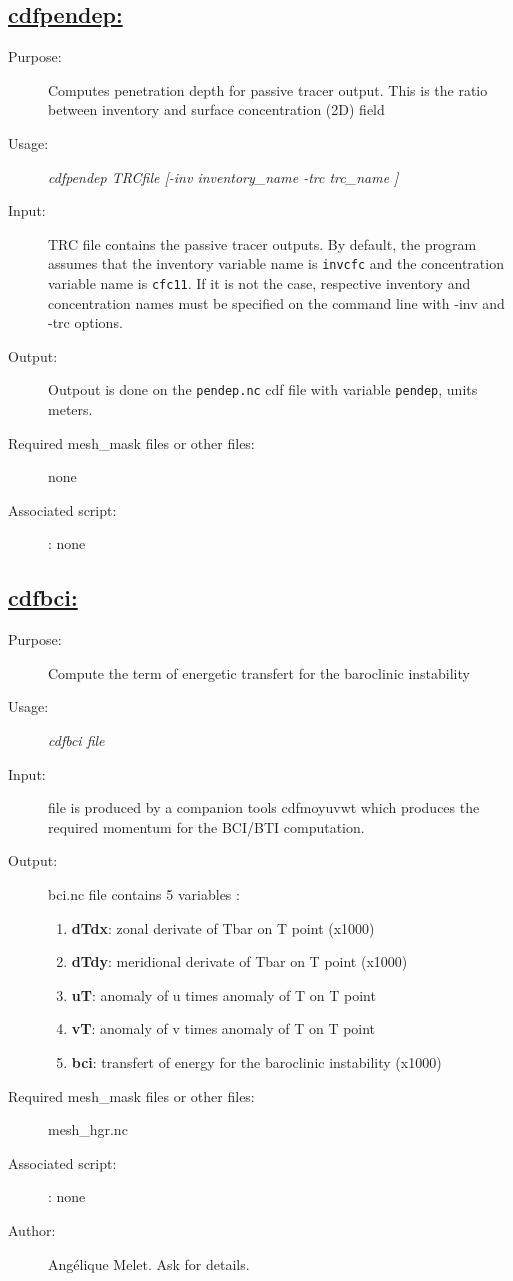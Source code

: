 \documentclass[a4paper,11pt]{article}
\begin{document}
\subsection*{\underline{cdfpendep:}}
\begin{description}
\item[Purpose:] Computes penetration depth for passive tracer output. This is the ratio between inventory
         and surface concentration (2D) field
\item[Usage:] {\em cdfpendep TRCfile [-inv inventory\_name  -trc trc\_name ] }
\item[Input:] TRC file contains the passive tracer outputs. By default, the program assumes that the inventory variable name is
{\tt invcfc} and the concentration variable name is {\tt cfc11}. If it is not the case, respective inventory and concentration names must
be specified on the command line with -inv and -trc options.
\item[Output:] Outpout is done on the {\tt pendep.nc} cdf file with variable {\tt pendep}, units meters.
\item[Required mesh\_mask files or other files:] none
\item[Associated script:] : none
\end{description}

\newpage
\subsection*{\underline{cdfbci:}}
\begin{description}
\item[Purpose:] Compute the term of energetic transfert for the baroclinic instability 
\item[Usage:] {\em cdfbci  file }
\item[Input:] file is produced by a companion tools cdfmoyuvwt which produces the required momentum for the BCI/BTI computation.
\item[Output:] bci.nc file contains 5 variables : 
     \begin{enumerate} 
        \item {\bf dTdx}:  zonal derivate of Tbar on T point (x1000)
        \item {\bf dTdy}:  meridional derivate of Tbar on T point (x1000)
        \item {\bf uT}: anomaly of u times anomaly of T on T point 
        \item {\bf vT}: anomaly of v times anomaly of T on T point 
        \item {\bf bci}: transfert of energy for the baroclinic instability (x1000)
      \end{enumerate}
\item[Required mesh\_mask files or other files:] mesh\_hgr.nc
\item[Associated script:] : none
\item[Author:] Ang\'elique Melet. Ask for details.
\end{description}
\end{document}
